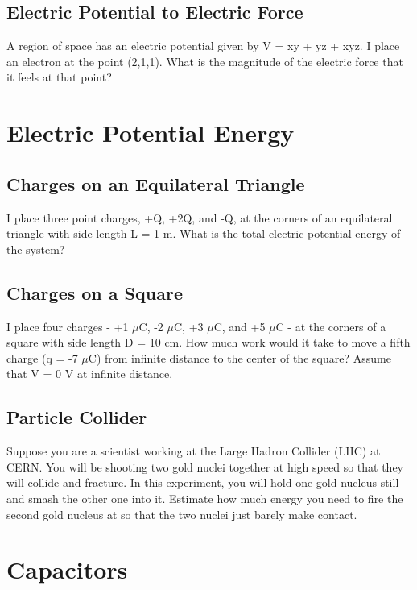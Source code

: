 \documentclass[11pt]{article}
\begin{document}
\subsection{Electric Potential to Electric Force}
A region of space has an electric potential given by V = xy + yz + xyz.  I place an electron at the point (2,1,1).  What is the magnitude of the electric force that it feels at that point?


\pagebreak
\section{Electric Potential Energy}

\subsection{Charges on an Equilateral Triangle}
I place three point charges, +Q, +2Q, and -Q, at the corners of an equilateral triangle with side length L = 1 m.  What is the total electric potential energy of the system?

\subsection{Charges on a Square}
I place four charges - +1 $\mu$C, -2 $\mu$C, +3 $\mu$C, and +5 $\mu$C - at the corners of a square with side length D = 10 cm.  How much work would it take to move a fifth charge (q = -7 $\mu$C) from infinite distance to the center of the square?  Assume that V = 0 V at infinite distance.

\subsection{Particle Collider}
Suppose you are a scientist working at the Large Hadron Collider (LHC) at CERN.  You will be shooting two gold nuclei together at high speed so that they will collide and fracture.  In this experiment, you will hold one gold nucleus still and smash the other one into it.  Estimate how much energy you need to fire the second gold nucleus at so that the two nuclei just barely make contact.


\pagebreak
\section{Capacitors}
\end{document}
